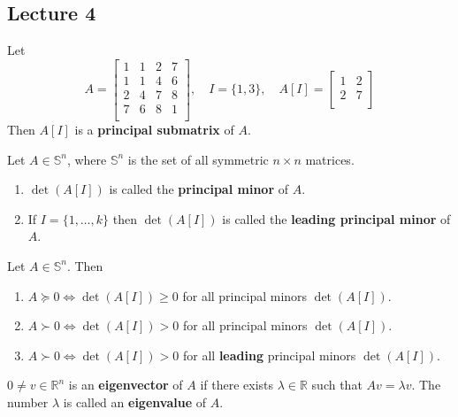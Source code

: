 \subsection{Lecture 4}


\begin{definition}
  Let $$A = \begin{bmatrix}
    1 & 1 & 2 & 7 \\
    1 & 1 & 4 & 6 \\
    2 & 4 & 7 & 8 \\
    7 & 6 & 8 & 1 \\
  \end{bmatrix}, \quad I = \{1,3\}, \quad A[I] = \begin{bmatrix}
    1 & 2 \\
    2 & 7 \\
  \end{bmatrix}$$
  Then $A[I]$ is a \textbf{principal submatrix} of $A$.
\end{definition}
\begin{definition}
  Let $A \in \mathbb S^n$, where $\mathbb S^n$ is the set of all symmetric $n \times n$ matrices.
\begin{enumerate}
  \item $\det(A[I])$ is called the \textbf{principal minor} of $A$.
  \item If $I = \{1,\ldots, k\}$ then $\det(A[I])$ is called the \textbf{leading principal minor} of $A$.
\end{enumerate}
\end{definition}
\begin{proposition}
  Let $A \in \mathbb S^n$. Then
  \begin{enumerate}
    \item $A \succeq 0 \iff \det(A[I]) \geq 0$ for all principal minors $\det(A[I])$.
    \item $A \succ 0 \iff \det(A[I]) > 0$ for all principal minors $\det(A[I])$.
    \item $A \succ 0 \iff \det(A[I]) > 0$ for all \textbf{leading} principal minors $\det(A[I])$.
  \end{enumerate}
\end{proposition}
\begin{definition}
  $0 \neq v \in \mathbb R^n$ is an \textbf{eigenvector} of $A$ if there exists $\lambda \in \mathbb R$ such that $Av = \lambda v$. The number $\lambda$ is called an \textbf{eigenvalue} of $A$.
\end{definition}
